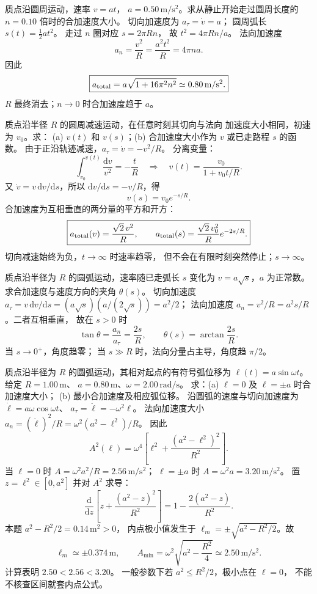 质点沿圆周运动，速率 $v=at$，
$a=0.50\,\mathrm{m/s^2}$。求从静止开始走过圆周长度的
$n=0.10$ 倍时的合加速度大小。
\exsolution
切向加速度为 $a_\tau=\dot v=a$；
圆周弧长 $s(t)=\frac12at^2$。
走过 $n$ 圈对应 $s=2\pi Rn$，
故 $t^2=4\pi Rn/a$。
法向加速度
\[
 a_n=\frac{v^2}{R}=\frac{a^2t^2}{R}=4\pi na .
\]
因此
\[
 \boxed{a_{\rm total}=a\sqrt{1+16\pi^2n^2}
 \simeq 0.80\,\mathrm{m/s^2}.}
\]
\excheck $R$ 最终消去；$n\to0$ 时合加速度趋于 $a$。

质点沿半径 $R$ 的圆周减速运动，在任意时刻其切向与法向
加速度大小相同，初速为 $v_0$。求：
(a) $v(t)$ 和 $v(s)$；(b) 合加速度大小作为 $v$ 或已走路程 $s$ 的函数。
\exsolution
由于正沿轨迹减速，$a_\tau=\dot v=-v^2/R$。
分离变量：
\[
 \int_{v_0}^{v(t)}\frac{\mathrm dv}{v^2}=-\frac tR
 \quad\Longrightarrow\quad
 \boxed{v(t)=\frac{v_0}{1+v_0t/R}}.
\]
又 $\dot v=v\,\mathrm dv/\mathrm ds$，所以
$\mathrm dv/\mathrm ds=-v/R$，得
\[
 \boxed{v(s)=v_0e^{-s/R}}.
\]
合加速度为互相垂直的两分量的平方和开方：
\[
 \boxed{a_{\rm total}(v)=\frac{\sqrt2\,v^2}{R},\qquad
 a_{\rm total}(s)=\frac{\sqrt2\,v_0^2}{R}e^{-2s/R}.}
\]
\excheck 切向减速始终为负，$t\to\infty$ 时速率趋零，
但不会在有限时刻突然停止；$s\to\infty$。

质点沿半径为 $R$ 的圆弧运动，速率随已走弧长 $s$ 变化为
$v=a\sqrt s$，$a$ 为正常数。求合加速度与速度方向的夹角 $\theta(s)$。
\exsolution
切向加速度 $a_\tau=v\,\mathrm dv/\mathrm ds
 =(a\sqrt s)(a/(2\sqrt s))=a^2/2$；
法向加速度 $a_n=v^2/R=a^2s/R$。二者互相垂直，
故在 $s>0$ 时
\[
 \boxed{\tan\theta=\frac{a_n}{a_\tau}=\frac{2s}{R},
 \qquad \theta(s)=\arctan\frac{2s}{R}.}
\]
\excheck 当 $s\to0^+$，角度趋零；
当 $s\gg R$ 时，法向分量占主导，角度趋 $\pi/2$。

质点沿半径为 $R$ 的圆弧运动，其相对起点的有符号弧位移为
$\ell(t)=a\sin\omega t$。给定 $R=1.00\,\mathrm m$、
$a=0.80\,\mathrm m$、$\omega=2.00\,\mathrm{rad/s}$。
求：(a) $\ell=0$ 及 $\ell=\pm a$ 时合加速度大小；
(b) 最小合加速度及相应弧位移。
\exsolution
沿圆弧的速度与切向加速度为
$\dot\ell=a\omega\cos\omega t$、
$a_\tau=\ddot\ell=-\omega^2\ell$。
法向加速度大小
$a_n=(\dot\ell)^2/R=\omega^2(a^2-\ell^2)/R$。
因此
\[
 A^2(\ell)=\omega^4\left[
 \ell^2+\frac{(a^2-\ell^2)^2}{R^2}\right].
\]
当 $\ell=0$ 时 $A=\omega^2a^2/R=2.56\,\mathrm{m/s^2}$；
$\ell=\pm a$ 时 $A=\omega^2a=3.20\,\mathrm{m/s^2}$。
置 $z=\ell^2\in[0,a^2]$ 并对 $A^2$ 求导：
\[
 \frac{\mathrm d}{\mathrm dz}
 \left[z+\frac{(a^2-z)^2}{R^2}\right]
 =1-\frac{2(a^2-z)}{R^2}.
\]
本题 $a^2-R^2/2=0.14\,\mathrm{m^2}>0$，
内点极小值发生于
$\ell_m=\pm\sqrt{a^2-R^2/2}$。故
\[
 \boxed{\ell_m\simeq\pm0.374\,\mathrm m,\qquad
 A_{\min}=\omega^2\sqrt{a^2-\frac{R^2}{4}}
 \simeq2.50\,\mathrm{m/s^2}.}
\]
\excheck 计算表明 $2.50<2.56<3.20$。
一般参数下若 $a^2\le R^2/2$，极小点在 $\ell=0$，
不能不核查区间就套内点公式。

